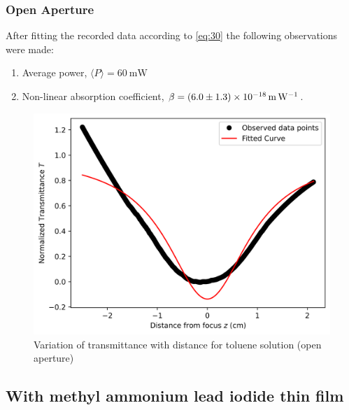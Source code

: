 \documentclass[%
 reprint,
 amsmath,amssymb,
 aps,
]{revtex4-2}
\begin{document}
		\subsubsection{Open Aperture}
		After fitting the recorded data according to \eqref{eq:30} the following observations were made:
		\begin{enumerate} 
			\item Average power, $ \langle P \rangle  = \SI{60}{\milli \watt}$
			\item Non-linear absorption coefficient, $ \beta = \SI[separate-uncertainty=true]{6.0 \pm 1.3e-18}{\meter \per \watt} $.
		\end{enumerate}
		\begin{figure}
			\includegraphics[scale = 0.59]{tol-o}
			\caption{Variation of transmittance with distance for toluene solution (open aperture)}
		\end{figure}
		
		
		
		
		
		
	\subsection{With methyl ammonium lead iodide thin film}
\end{document}

